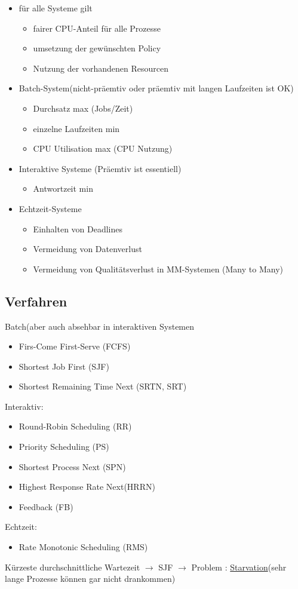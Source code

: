 \documentclass[a4paper]{scrreprt}
\begin{document}
\begin{itemize}
\item für alle Systeme gilt
\begin{itemize}
\item fairer CPU-Anteil für alle Prozesse
\item umsetzung der gewünschten Policy
\item Nutzung der vorhandenen Resourcen
\end{itemize}
\item Batch-System(nicht-präemtiv oder präemtiv mit langen Laufzeiten ist OK)
\begin{itemize}
\item Durchsatz max (Jobs/Zeit)
\item einzelne Laufzeiten min
\item CPU Utilisation max (CPU Nutzung)
\end{itemize}
\item Interaktive Systeme (Präemtiv ist essentiell)
\begin{itemize}
\item Antwortzeit min
\end{itemize}
\item Echtzeit-Systeme
\begin{itemize}
\item Einhalten von Deadlines
\item Vermeidung von Datenverlust
\item Vermeidung von Qualitätsverlust in MM-Systemen (Many to Many)
\end{itemize}
\end{itemize}
\subsection{Verfahren}
Batch(aber auch absehbar in interaktiven Systemen
\begin{itemize}
\item Firs-Come First-Serve (FCFS)
\item Shortest Job First (SJF)
\item Shortest Remaining Time Next (SRTN, SRT)
\end{itemize}
Interaktiv:
\begin{itemize}
\item Round-Robin Scheduling (RR)
\item Priority Scheduling (PS)
\item Shortest Process Next (SPN)
\item Highest Response Rate Next(HRRN)
\item Feedback (FB)
\end{itemize}
Echtzeit:
\begin{itemize}
\item Rate Monotonic Scheduling (RMS)
\end{itemize}
Kürzeste durchschnittliche Wartezeit $\rightarrow$ SJF $\rightarrow$ Problem : \underline{Starvation}(sehr lange Prozesse können gar nicht drankommen)
\end{document}
